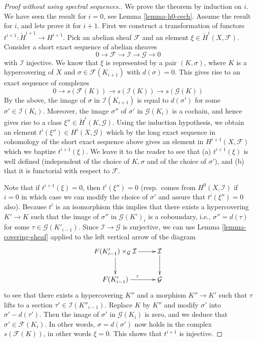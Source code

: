 \begin{proof}[Proof without using spectral sequences.]
We prove the theorem by induction on $i$.
We have seen the result for $i = 0$, see Lemma \ref{lemma-h0-cech}.
Assume the result for $i$, and lets prove it
for $i + 1$. First we construct a
transformation of functors $t^{i + 1} : \check{H}^{i + 1} \to H^{i + 1}$.
Pick an abelian sheaf $\mathcal{F}$ and an element
$\xi \in \check{H}^i(X, \mathcal{F})$. Consider a short exact
sequence of abelian sheaves
$$
0 \to \mathcal{F} \to \mathcal{I} \to \mathcal{G} \to 0
$$
with $\mathcal{I}$ injective.
We know that $\xi$ is represented by a pair $(K, \sigma)$, where
$K$ is a hypercovering of $X$ and $\sigma \in \mathcal{F}(K_{i + 1})$
with $d(\sigma) = 0$.
This gives rise to an exact sequence of complexes
$$
0 \to s(\mathcal{F}(K)) \to s(\mathcal{I}(K)) \to s(\mathcal{G}(K))
$$
By the above, the image of $\sigma$ in $\mathcal{I}(K_{i + 1})$
is equal to $d(\sigma')$ for some $\sigma' \in \mathcal{I}(K_i)$.
Moreover, the image $\sigma''$ of $\sigma'$ in $\mathcal{G}(K_i)$
is a cochain, and hence gives rise to a class
$\xi'' \in \check{H}^i(K, \mathcal{G})$. Using the induction
hypothesis, we obtain an element $t^i(\xi'') \in H^i(X, \mathcal{G})$
which by the long exact sequence
in cohomology of the short exact sequence above gives an
element in $H^{i + 1}(X, \mathcal{F})$ which we baptize
$t^{i + 1}(\xi)$.
We leave it to the reader to see that (a) $t^{i + 1}(\xi)$
is well defined (independent of the choice of $K, \sigma$
and of the choice of $\sigma'$), and (b) that it is functorial
with respect to $\mathcal{F}$.

\medskip\noindent
Note that if $t^{i + 1}(\xi) = 0$, then $t^i(\xi'') = 0$
(resp.\ comes from $H^0(X, \mathcal{I})$ if $i = 0$ in which
case we can modify the choice of $\sigma'$ and assure that
$t^i(\xi'') = 0$ also). Because $t^i$ is an isomorphism
this implies that there exists a
hypercovering $K' \to K$ such that the image of $\sigma''$
in $\mathcal{G}(K')_i$ is a coboundary, i.e.,
$\sigma'' = d(\tau)$ for some $\tau \in \mathcal{G}(K'_{i - 1})$.
Since $\mathcal{I} \to \mathcal{G}$ is surjective,
we can use Lemma \ref{lemma-covering-sheaf} applied to the
left vertical arrow of the diagram
$$
\xymatrix{
F(K'_{i - 1})\times_{\mathcal{G}} \mathcal{I} \ar[d] \ar[r] &
\mathcal{I} \ar[d] \\
F(K'_{i - 1}) \ar[r]^\tau &
\mathcal{G}
}
$$
to see that there exists a hypercovering $K''$ and a morphism $K'' \to K'$
such that $\tau$ lifts to a section $\tau' \in \mathcal{I}(K''_{i - 1})$.
Replace $K$ by $K''$ and modify $\sigma'$ into
$\sigma' - d(\tau')$. Then the image of $\sigma'$ in
$\mathcal{G}(K_i)$ is zero, and we deduce that
$\sigma' \in \mathcal{F}(K_i)$. In other words, $\sigma = d(\sigma')$
now holds in the complex $s(\mathcal{F}(K))$, in other words
$\xi = 0$. This shows that $t^{i + 1}$ is injective.


\end{proof}
